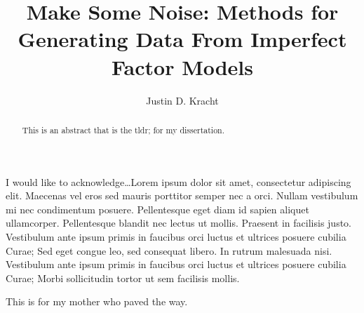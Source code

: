 \documentclass[11pt]{umnthesis}
\title{Make Some Noise: Methods for Generating Data From Imperfect Factor Models}
\author{Justin D. Kracht}
\begin{document}
\frenchspacing %



\makesignaturepage %
\maketitlepage %
\makecopyrightpage %



\frontmatter
\pagestyle{empty} %



  \begin{acknowledgements}
    I would like to acknowledge\ldots Lorem ipsum dolor sit amet, consectetur adipiscing elit. Maecenas vel eros sed mauris porttitor semper nec a orci. Nullam vestibulum mi nec condimentum posuere. Pellentesque eget diam id sapien aliquet ullamcorper. Pellentesque blandit nec lectus ut mollis. Praesent in facilisis justo. Vestibulum ante ipsum primis in faucibus orci luctus et ultrices posuere cubilia Curae; Sed eget congue leo, sed consequat libero. In rutrum malesuada nisi. Vestibulum ante ipsum primis in faucibus orci luctus et ultrices posuere cubilia Curae; Morbi sollicitudin tortor ut sem facilisis mollis.
  \end{acknowledgements}



  \begin{dedication}
    This is for my mother who paved the way.
  \end{dedication}



  \begin{abstract}
    This is an abstract that is the tldr; for my dissertation.
  \end{abstract}



\makeatletter
\def\maxwidth{ %
  \ifdim\Gin@nat@width>\linewidth
    \linewidth
  \else
    \Gin@nat@width
  \fi
}
\makeatother

\renewcommand{\contentsname}{Table of Contents}

\setlength{\parskip}{0pt}

\providecommand{\tightlist}{%
  \setlength{\itemsep}{0pt}\setlength{\parskip}{0pt}}
\end{document}
